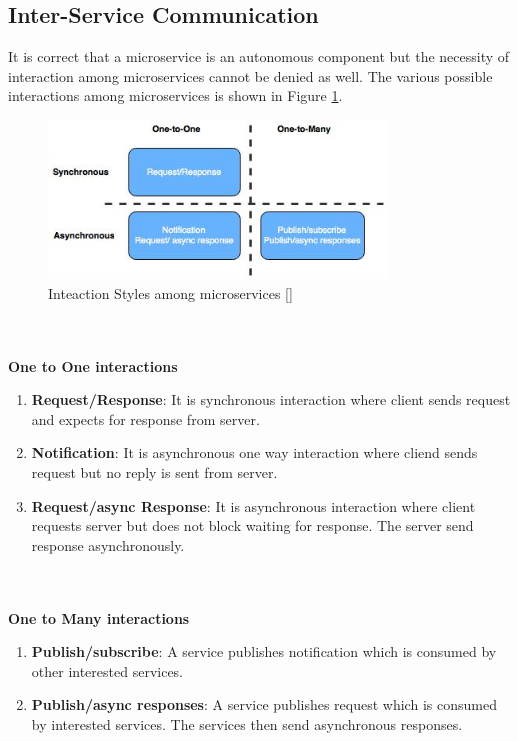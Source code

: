 \subsection{Inter-Service Communication}\label{section:challanges_of_microservices_architecture/integration/inter_service_communication}
It is correct that a microservice is an autonomous component but the necessity of interaction among microservices cannot be denied as well. The various possible interactions among microservices is shown in Figure \ref{fig:challanges_of_microservices_architecture/integration/inter_service_communication/interaction_styles_among_microservices}.\cite{Richardson:2015ab}
\begin{figure}[H]
\begin{center}
\includegraphics[width=0.8\textwidth]{figures/challenges_one_interaction_styles}
\caption{Inteaction Styles among microservices [\cite{Richardson:2015ab}]}
\label{fig:challanges_of_microservices_architecture/integration/inter_service_communication/interaction_styles_among_microservices}
\end{center}
\end{figure}
\\
\\
\textbf{One to One interactions}
\\
\begin{enumerate}
\item \textbf{Request/Response}: It is synchronous interaction where client sends request and expects for response from server.
\item \textbf{Notification}: It is asynchronous one way interaction where cliend sends request but no reply is sent from server.
\item \textbf{Request/async Response}: It is asynchronous interaction where client requests server but does not block waiting for response. The server send response asynchronously.
\end{enumerate}
\\
\\
\textbf{One to Many interactions}
\\
\begin{enumerate}
\item \textbf{Publish/subscribe}: A service publishes notification which is consumed by other interested services.
\item \textbf{Publish/async responses}: A service publishes request which is consumed by interested services. The services then send asynchronous responses.
\end{enumerate}
\\
\\

